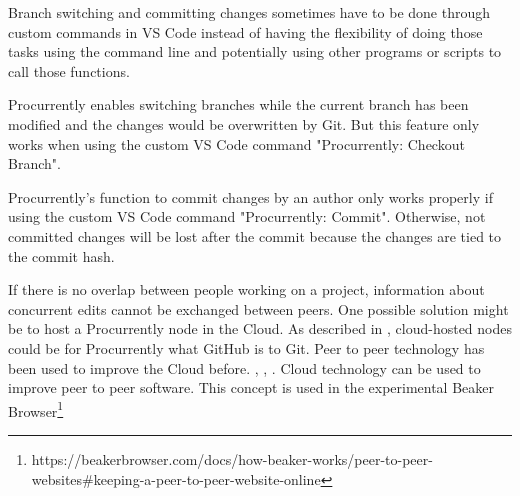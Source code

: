 Branch switching and committing changes sometimes have to be done through custom commands in VS Code instead of having the flexibility of doing those tasks using the command line and potentially using other programs or scripts to call those functions.

Procurrently enables switching branches while the current branch has been modified and the changes would be overwritten by Git. But this feature only works when using the custom VS Code command "Procurrently: Checkout Branch".

Procurrently's function to commit changes by an author only works properly if using the custom VS Code command "Procurrently: Commit". Otherwise, not committed changes will be lost after the commit because the changes are tied to the commit hash.

If there is no overlap between people working on a project, information about concurrent edits cannot be exchanged between peers.
One possible solution might be to host a Procurrently node in the Cloud. As described in \cite{6188603}, cloud-hosted nodes could be for Procurrently what GitHub is to Git. 
Peer to peer technology has been used to improve the Cloud before. \cite{Ranjan2013}, \cite{Ranjan2010}, \cite{Babaoglu:2012:DIP:2245276.2245357}. Cloud technology can be used to improve peer to peer software. This concept is used in the experimental Beaker Browser\footnote{https://beakerbrowser.com/docs/how-beaker-works/peer-to-peer-websites\#keeping-a-peer-to-peer-website-online}
